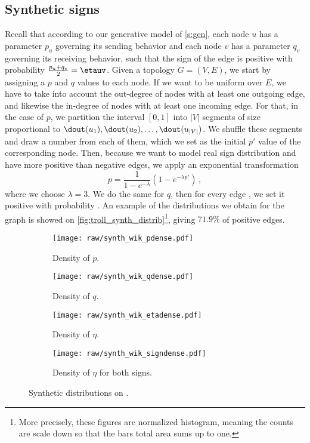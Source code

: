 \subsection{Synthetic signs}

Recall that according to our generative model of \autoref{s:gen}, each node $u$ has a parameter $p_u$
governing its sending behavior and each node $v$ has a parameter $q_v$ governing its receiving
behavior, such that the sign of the edge \euv{} is positive with probability $\frac{p_u+q_v}{2} =
\etauv$. Given a topology $G=(V,E)$, we start by assigning a $p$ and $q$ values to each node. If we
want \etauv{} to be uniform over $E$, we have to take into account the out-degree of nodes with at
least one outgoing edge, and likewise the in-degree of nodes with at least one incoming edge. For
that, in the case of $p$, we partition the interval $[0,1]$ into $|V|$ segments of size proportional
to $\dout(u_1),
\dout(u_2), \ldots, \dout(u_{|V|})$. We shuffle these segments and draw a number \uar{} from each of
them, which we set as the initial $p'$ value of the corresponding node. Then, because we want to model real
sign distribution and have more
positive than negative edges, we apply an exponential transformation \[ p = \frac{1}{1-e^{-\lambda}}
\left( 1-e^{-\lambda p'} \right) \,,\] where we choose $\lambda=3$. We do the same for $q$, then for
every edge \euv{}, we set it positive with probability \etauv{}. An example of the distributions we
obtain for the \wik{} graph is showed on \autoref{fig:troll_synth_distrib}\footnote{More precisely,
these figures are normalized histogram, meaning the counts are scale down so that the bars total
area sums up to one.}, giving $71.9\%$ of positive edges.

\begin{figure*}[hbtp]
  \centering
  \begin{subfigure}[b]{0.401\textwidth} 
    \centering
    \texttt{[image: raw/synth\_wik\_pdense.pdf]}
    \caption{Density of $p$.}
  \end{subfigure}\quad
  \begin{subfigure}[b]{0.401\textwidth} 
    \centering
    \texttt{[image: raw/synth\_wik\_qdense.pdf]}
    \caption{Density of $q$.}
  \end{subfigure}

  \begin{subfigure}[b]{0.401\textwidth} 
    \centering
    \texttt{[image: raw/synth\_wik\_etadense.pdf]}
    \caption{Density of $\eta$.}
  \end{subfigure}\quad
  \begin{subfigure}[b]{0.401\textwidth} 
    \centering
    \texttt{[image: raw/synth\_wik\_signdense.pdf]}
    \caption{Density of $\eta$ for both signs.}
  \end{subfigure}
  \caption{Synthetic distributions on \wik{}.} 
  \label{fig:troll_synth_distrib} 
\end{figure*}

